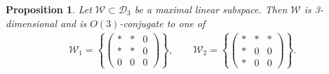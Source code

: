 \documentclass[10pt,a4paper]{amsart}
\def\W{\mathscr{W}}
\def\D{\mathcal{D}}
\newtheorem{Proposition}[Theorem]{Proposition}
\numberwithin{equation}{section}
\begin{document}
\begin{Proposition} \label{sing3max}
Let $\W\subset \D_3$ be a maximal linear subspace. Then $\W$ is 3-dimensional and is $O(3)$-conjugate to one of
\begin{gather*}
 \W_1 = \left\{\!\! \begin{pmatrix} * & * & 0 \\ * & * & 0 \\ 0 & 0 & 0\end{pmatrix}\!\! \right\} ,\qquad
\W_2 = \left\{\!\! \begin{pmatrix} * & * & * \\ * & 0 & 0 \\ * & 0 & 0\end{pmatrix}\!\! \right\} .
\end{gather*}
\end{Proposition}
\end{document}
